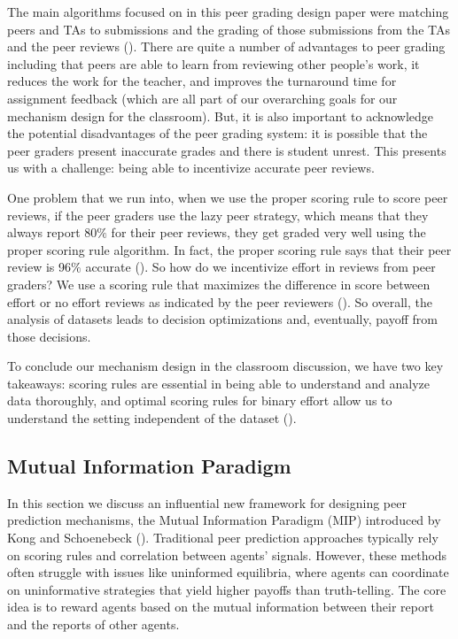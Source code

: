 \documentclass[
  letterpaper,
  DIV=11,
  numbers=noendperiod,
  oneside]{scrreprt}
\theoremstyle{remark}
\begin{document}
The main algorithms focused on in this peer grading design paper were
matching peers and TAs to submissions and the grading of those
submissions from the TAs and the peer reviews
(). There are quite a
number of advantages to peer grading including that peers are able to
learn from reviewing other people's work, it reduces the work for the
teacher, and improves the turnaround time for assignment feedback (which
are all part of our overarching goals for our mechanism design for the
classroom). But, it is also important to acknowledge the potential
disadvantages of the peer grading system: it is possible that the peer
graders present inaccurate grades and there is student unrest. This
presents us with a challenge: being able to incentivize accurate peer
reviews.

One problem that we run into, when we use the proper scoring rule to
score peer reviews, if the peer graders use the lazy peer strategy,
which means that they always report 80\(\%\) for their peer reviews,
they get graded very well using the proper scoring rule algorithm. In
fact, the proper scoring rule says that their peer review is 96\(\%\)
accurate (). So how do we
incentivize effort in reviews from peer graders? We use a scoring rule
that maximizes the difference in score between effort or no effort
reviews as indicated by the peer reviewers
(). So overall, the
analysis of datasets leads to decision optimizations and, eventually,
payoff from those decisions.

To conclude our mechanism design in the classroom discussion, we have
two key takeaways: scoring rules are essential in being able to
understand and analyze data thoroughly, and optimal scoring rules for
binary effort allow us to understand the setting independent of the
dataset ().

\subsection*{Mutual Information
Paradigm}\label{mutual-information-paradigm}

In this section we discuss an influential new framework for designing
peer prediction mechanisms, the Mutual Information Paradigm (MIP)
introduced by Kong and Schoenebeck
().
Traditional peer prediction approaches typically rely on scoring rules
and correlation between agents' signals. However, these methods often
struggle with issues like uninformed equilibria, where agents can
coordinate on uninformative strategies that yield higher payoffs than
truth-telling. The core idea is to reward agents based on the mutual
information between their report and the reports of other agents.
\end{document}
